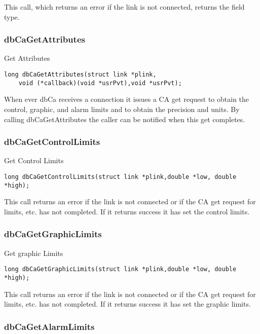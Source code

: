 This call, which returns an error if the link is not connected, returns the field type.

\subsubsection{dbCaGetAttributes}

Get Attributes

\begin{verbatim}
long dbCaGetAttributes(struct link *plink,
    void (*callback)(void *usrPvt),void *usrPvt);
\end{verbatim}

When ever dbCa receives a connection it issues a CA get request to obtain the control, graphic, and alarm limits and to obtain the precision and units.
By calling dbCaGetAttributes the caller can be notified when this get completes.

\subsubsection{dbCaGetControlLimits}

Get Control Limits

\begin{verbatim}
long dbCaGetControlLimits(struct link *plink,double *low, double *high);
\end{verbatim}

This call returns an error if the link is not connected or if the CA get request for limits, etc. has not completed.
If it returns success it has set the control limits.

\subsubsection{dbCaGetGraphicLimits}

Get graphic Limits

\begin{verbatim}
long dbCaGetGraphicLimits(struct link *plink,double *low, double *high);
\end{verbatim}

This call returns an error if the link is not connected or if the CA get request for limits, etc. has not completed.
If it returns success it has set the graphic limits.

\subsubsection{dbCaGetAlarmLimits}

